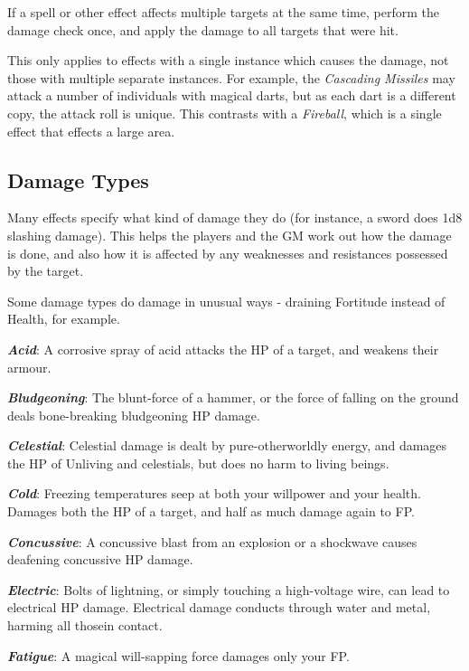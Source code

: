 If a spell or other effect affects multiple targets at the same time, perform the damage check once, and apply the damage to all targets that were hit. 

This only applies to effects with a single instance which causes the damage, not those with multiple separate instances. For example, the {\it Cascading Missiles} may attack a number of individuals with magical darts, but as each dart is a different copy, the attack roll is unique. This contrasts with a {\it Fireball}, which is a single effect that effects a large area. 

\subsection{Damage Types}



Many effects specify what kind of damage they do (for instance, a sword does 1d8 slashing damage). This helps the players and the GM work out how the damage is done, and also how it is affected by any weaknesses and resistances possessed by the target. 

Some damage types do damage in unusual ways - draining Fortitude instead of Health, for example. 

\newcommand\damage[2]
{
\textbf{ \textit{#1}}: #2
}

\damage{Acid}{A corrosive spray of acid attacks the HP of a target, and weakens their armour.}

\damage{Bludgeoning}{The blunt-force of a hammer, or the force of falling on the ground deals bone-breaking bludgeoning HP damage.}

\damage{Celestial}{Celestial damage is dealt by pure-otherworldly energy, and damages the HP of Unliving and celestials, but does no harm to living beings.}

\damage{Cold}{Freezing temperatures seep at both your willpower and your health. Damages both the HP of a target, and half as much damage again to FP. } 

\damage{Concussive}{A concussive blast from an explosion or a shockwave causes deafening concussive HP damage.}

\damage{Electric}{Bolts of lightning, or simply touching a high-voltage wire, can lead to electrical HP damage. Electrical damage conducts through water and metal, harming all thosein contact.}

\damage{Fatigue}{A magical will-sapping force damages only your FP.}

